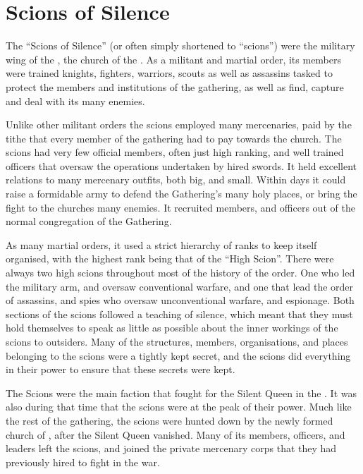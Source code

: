 \section{Scions of Silence}
\label{sec:Scions of Silence}

The ``Scions of Silence'' (or often simply shortened to ``scions'') were the
military wing of the , the church of the
. As a militant and martial order, its members were
trained knights, fighters, warriors, scouts as well as assassins tasked to
protect the members and institutions of the gathering, as well as find,
capture and deal with its many enemies.

Unlike other militant orders the scions employed many mercenaries, paid by
the tithe that every member of the gathering had to pay towards the church.
The scions had very few official members, often just high ranking, and well
trained officers that oversaw the operations undertaken by hired swords. It
held excellent relations to many mercenary outfits, both big, and
small. Within days it could raise a formidable army to defend the Gathering's
many holy places, or bring the fight to the churches many enemies. It
recruited members, and officers out of the normal congregation of the
Gathering.

As many martial orders, it used a strict hierarchy of ranks to keep itself
organised, with the highest rank being that of the ``High Scion''. There were
always two high scions throughout most of the history of the order. One who
led the military arm, and oversaw conventional warfare, and one that lead the
order of assassins, and spies who oversaw unconventional warfare, and
espionage. Both sections of the scions followed a teaching of silence, which
meant that they must hold themselves to speak as little as possible about the
inner workings of the scions to outsiders. Many of the structures, members,
organisations, and places belonging to the scions were a tightly kept secret,
and the scions did everything in their power to ensure that these secrets were
kept.

The Scions were the main faction that fought for the Silent Queen in the
. It was also during that time that the scions were
at the peak of their power. Much like the rest of the gathering, the scions
were hunted down by the newly formed church of , after the
Silent Queen vanished. Many of its members, officers, and leaders left the
scions, and joined the private mercenary corps that they had previously hired
to fight in the war.

